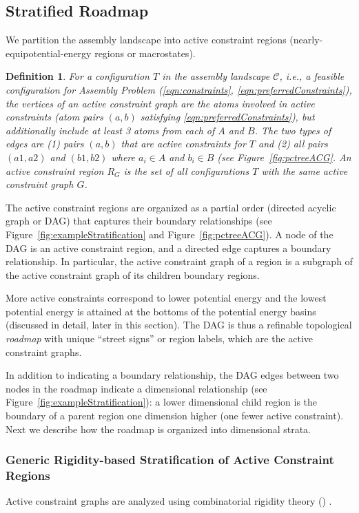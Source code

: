 \documentclass[]{article}
\newtheorem{definition}[theorem]{Definition}
\newcommand{\figref}[1]{Figure~\ref{#1}}
\newcommand{\ctwo}{\ref{eqn:preferredConstraints}}
\newcommand{\cone}{\ref{eqn:constraints}}
\newcommand{\rahul}[1]{\color{black}{#1}\color{black}}
\begin{document}
\subsection{Stratified Roadmap}
\label{sec:stratification}
We partition the assembly landscape into active constraint regions
(nearly-equipotential-energy regions or macrostates).
\begin{definition}
\label{def:ACG}
For a configuration $T$ in the assembly landscape $\mathcal{C}$, i.e., a feasible
configuration for Assembly Problem (\cone, \ctwo), the vertices of an \emph{active 
		constraint graph} are the atoms involved in active constraints (atom pairs
$(a,b)$ satisfying \ctwo), but additionally include at least 3 atoms from each of 
$A$ and $B$. The two types of edges are (1) pairs $(a,b)$ that are active constraints 
for $T$ and (2) all pairs $(a1, a2)$ and $(b1, b2)$ where $a_i \in A$ and $b_i \in B$ 
(see \figref{fig:pctreeACG}. An 
\emph{active constraint region} $R_G$ is the set of all configurations $T$ with the 
same active constraint graph $G$.
\end{definition}

The active constraint regions are organized as a partial order (directed
acyclic graph or DAG) that captures their boundary relationships (see
\figref{fig:exampleStratification} and \figref{fig:pctreeACG}). A node of the
DAG is an active constraint region, and a directed edge captures a boundary
relationship. In particular, the active constraint graph of a region is a
subgraph of the active constraint graph of its children boundary regions. 

More active constraints correspond to lower potential energy and the lowest
potential energy is attained at the bottoms of the potential energy basins
(discussed in detail, later in this section). The DAG is thus a refinable
topological \emph{roadmap} with unique ``street signs'' or region labels, which
are the active constraint graphs. 

In addition to indicating a boundary relationship, the DAG edges between two
nodes in the roadmap indicate a dimensional relationship (see
\figref{fig:exampleStratification}): a lower dimensional child region is the
boundary of a parent region one dimension higher (one fewer active constraint).
Next we describe how the roadmap is organized into dimensional strata.

\subsubsection{Generic Rigidity-based Stratification of Active Constraint Regions}
\label{sec:rigidity}
Active constraint graphs are analyzed using combinatorial rigidity theory
(\rahul{discussed in Section \ref{sec:app:rigidity} of the Appendix})
\cite{SJS:Handbook,CombinatorialRigidity}. 
\end{document}
